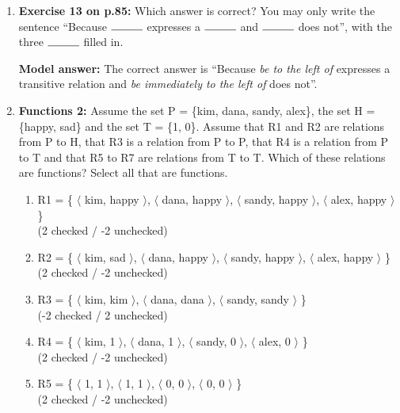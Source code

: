 \documentclass[a4,11pt]{article}
\begin{document}
\begin{enumerate}[leftmargin = 12pt]
{\bf Model answer:} The correct answer is ``Because {\em sibling} expresses a symmetric relation and {\em brother} does not''. To see that {\em brother} is not symmetric, consider Jake and Maggie Gyllenhaal. Jake is Maggie's brother, but not vice versa.

\item {\bf Exercise 13 on p.85:} Which answer is correct? You may only write the sentence ``Because $\rule{1cm}{0.15mm}$ expresses a $\rule{1cm}{0.15mm}$ and $\rule{1cm}{0.15mm}$ does not'', with the three $\rule{1cm}{0.15mm}$ filled in.

{\bf Model answer:} The correct answer is ``Because {\em be to the left of} expresses a transitive relation and {\em be immediately to the left of} does not''. 

\item {\bf Functions 2:} Assume the set P = \{kim, dana, sandy, alex\}, the set H = \{happy, sad\} and the set T = \{1, 0\}. Assume that R1 and R2 are relations from P to H, that R3 is a relation from P to P, that R4 is a relation from P to T and that R5 to R7 are relations from T to T. Which of these relations are functions? Select all that are functions.

\begin{enumerate}[noitemsep]
        \item R1 = \{ $\langle$ kim, happy $\rangle$, $\langle$ dana, happy $\rangle$,  $\langle$ sandy, happy $\rangle$,  $\langle$ alex, happy $\rangle$ \} \\ (2 checked / -2 unchecked)

        \item R2 = \{ $\langle$ kim, sad $\rangle$, $\langle$ dana, happy $\rangle$,  $\langle$ sandy, happy $\rangle$,  $\langle$ alex, happy $\rangle$ \} \\ (2 checked / -2 unchecked)
        
	\item R3 = \{ $\langle$ kim, kim $\rangle$, $\langle$ dana, dana $\rangle$,  $\langle$ sandy, sandy $\rangle$ \} \\ (-2 checked / 2 unchecked)

	 \item R4 = \{ $\langle$ kim, 1 $\rangle$, $\langle$ dana, 1 $\rangle$,  $\langle$ sandy, 0 $\rangle$,  $\langle$ alex, 0 $\rangle$ \} \\ (2 checked / -2 unchecked)
	 
	 \item R5 =  \{ $\langle$ 1, 1 $\rangle$, $\langle$ 1, 1 $\rangle$,  $\langle$ 0, 0 $\rangle$,  $\langle$ 0, 0 $\rangle$ \} \\ (2 checked / -2 unchecked)
	 

\end{enumerate}
\end{enumerate}
\end{document}
